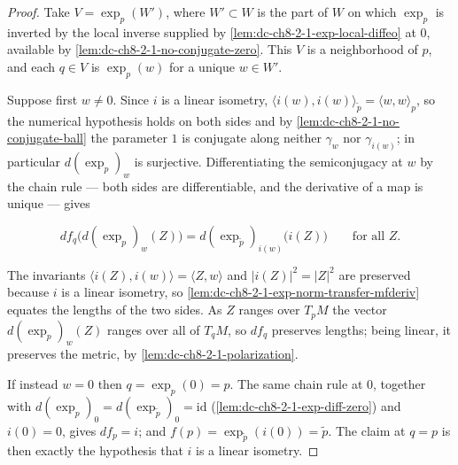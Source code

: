\begin{proof}
  \leanok
\sketch
  Take $V=\exp_p(W')$, where $W'\subset W$ is the part of $W$ on which $\exp_p$ is inverted by the
  local inverse supplied by \cref{lem:dc-ch8-2-1-exp-local-diffeo} at $0$, available by
  \cref{lem:dc-ch8-2-1-no-conjugate-zero}. This $V$ is a neighborhood of $p$, and each $q\in V$ is
  $\exp_p(w)$ for a unique $w\in W'$.

  Suppose first $w\neq0$. Since $i$ is a linear isometry, $\langle i(w),i(w)\rangle_{\tilde p}
  =\langle w,w\rangle_p$, so the numerical hypothesis holds on both sides and by
  \cref{lem:dc-ch8-2-1-no-conjugate-ball} the parameter $1$ is conjugate along neither $\gamma_w$
  nor $\gamma_{i(w)}$; in particular $d(\exp_p)_w$ is surjective. Differentiating the semiconjugacy
  at $w$ by the chain rule --- both sides are differentiable, and the derivative of a map is unique
  --- gives

  $$
  df_q\big(d(\exp_p)_w(Z)\big)=d(\exp_{\tilde p})_{i(w)}\big(i(Z)\big)\qquad\text{for all }Z .
  $$

  The invariants $\langle i(Z),i(w)\rangle=\langle Z,w\rangle$ and $|i(Z)|^2=|Z|^2$ are preserved
  because $i$ is a linear isometry, so \cref{lem:dc-ch8-2-1-exp-norm-transfer-mfderiv} equates the
  lengths of the two sides. As $Z$ ranges over $T_pM$ the vector $d(\exp_p)_w(Z)$ ranges over all of
  $T_qM$, so $df_q$ preserves lengths; being linear, it preserves the metric, by
  \cref{lem:dc-ch8-2-1-polarization}.

  If instead $w=0$ then $q=\exp_p(0)=p$. The same chain rule at $0$, together with
  $d(\exp_p)_0=d(\exp_{\tilde p})_0=\mathrm{id}$ (\cref{lem:dc-ch8-2-1-exp-diff-zero}) and
  $i(0)=0$, gives $df_p=i$; and $f(p)=\exp_{\tilde p}(i(0))=\tilde p$. The claim at $q=p$ is then
  exactly the hypothesis that $i$ is a linear isometry.
\end{proof}

